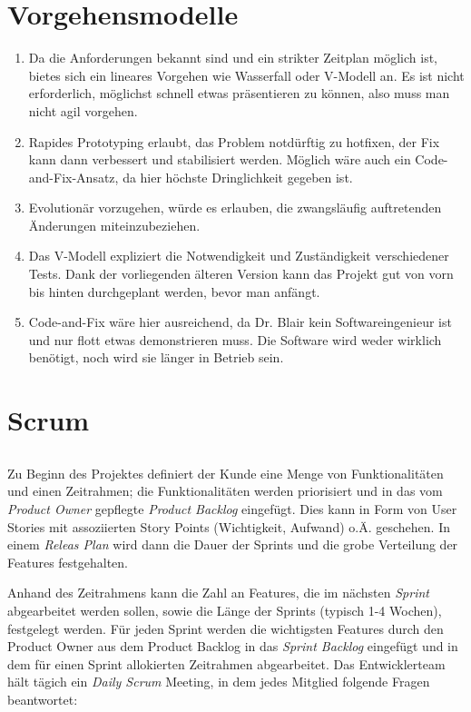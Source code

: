 \documentclass{scrartcl}
\begin{document}
\section{Vorgehensmodelle}
\begin{enumerate}
   \item Da die Anforderungen bekannt sind und ein strikter Zeitplan möglich
      ist, bietes sich ein lineares Vorgehen wie Wasserfall oder V-Modell an.
      Es ist nicht erforderlich, möglichst schnell etwas präsentieren zu können,
      also muss man nicht agil vorgehen.
   \item Rapides Prototyping erlaubt, das Problem notdürftig zu hotfixen, der
      Fix kann dann verbessert und stabilisiert werden. Möglich wäre auch ein
      Code-and-Fix-Ansatz, da hier höchste Dringlichkeit gegeben ist.
   \item Evolutionär vorzugehen, würde es erlauben, die zwangsläufig
      auftretenden Änderungen miteinzubeziehen.
   \item Das V-Modell expliziert die Notwendigkeit und Zuständigkeit
      verschiedener Tests. Dank der vorliegenden älteren Version kann das
      Projekt gut von vorn bis hinten durchgeplant werden, bevor man anfängt.
   \item Code-and-Fix wäre hier ausreichend, da Dr. Blair kein
      Softwareingenieur ist und nur flott etwas demonstrieren muss. Die Software
      wird weder wirklich benötigt, noch wird sie länger in Betrieb sein.
\end{enumerate}

\section{Scrum}

\subsection{}

Zu Beginn des Projektes definiert der Kunde eine Menge von Funktionalitäten und
einen Zeitrahmen; die Funktionalitäten werden priorisiert und in das vom
\emph{Product Owner} gepflegte \emph{Product Backlog} eingefügt. Dies kann in
Form von User Stories mit assoziierten Story Points (Wichtigkeit, Aufwand) o.Ä.
geschehen. In einem \emph{Releas Plan} wird dann die Dauer der Sprints und die
grobe Verteilung der Features festgehalten.

Anhand des Zeitrahmens kann die Zahl an Features, die im nächsten
\emph{Sprint} abgearbeitet werden sollen, sowie die Länge der Sprints (typisch
1-4 Wochen), festgelegt werden. Für jeden Sprint werden die wichtigsten Features
durch den Product Owner aus dem Product Backlog in das \emph{Sprint Backlog}
eingefügt und in dem für einen Sprint allokierten Zeitrahmen abgearbeitet. Das
Entwicklerteam hält tägich ein \emph{Daily Scrum} Meeting, in dem jedes Mitglied
folgende Fragen beantwortet:
\end{document}
